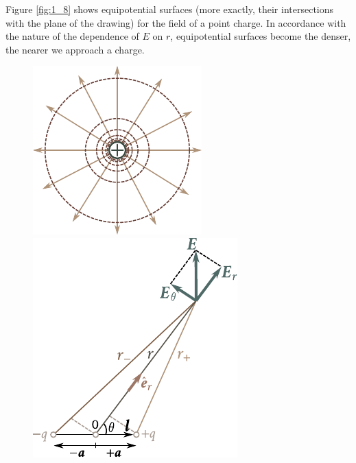 Figure \ref{fig:1_8} shows equipotential surfaces (more exactly, their intersections with the plane of the drawing) for the field of a point charge. In accordance with the nature of the dependence of $E$ on $r$, equipotential surfaces become the denser, the nearer we approach
a charge.

\begin{figure}[t]
	\begin{minipage}[t]{0.5\linewidth}
		\begin{center}
			\includegraphics[scale=1]{figures/ch_01/fig_1_8.pdf}
			\caption[]{}
			\label{fig:1_8}
		\end{center}
	\end{minipage}
	\hspace{-0.05cm}
	\begin{minipage}[t]{0.5\linewidth}
		\begin{center}
			\includegraphics[scale=0.95]{figures/ch_01/fig_1_9.pdf}
			\caption[]{}
			\label{fig:1_9}
		\end{center}
	\end{minipage}
\vspace{-0.4cm}
\end{figure}

